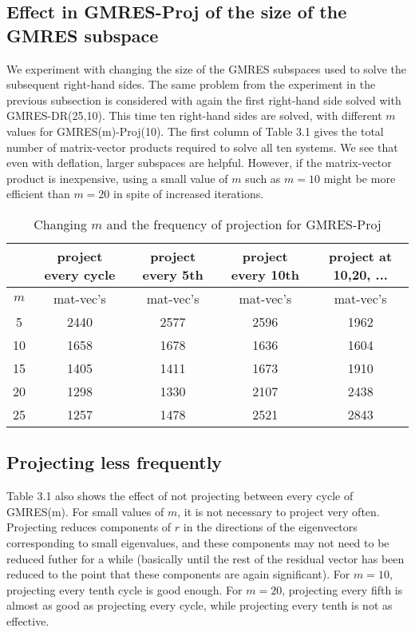 \documentclass[final]{siamltex}
\begin{document}
\subsection{Effect in GMRES-Proj of the size of the GMRES subspace} 

We experiment with changing the size of the GMRES subspaces used to solve the subsequent right-hand sides.  The same problem from the experiment in the previous subsection is considered with again the first right-hand side solved with GMRES-DR(25,10).  This time ten right-hand sides are solved, with different $m$ values for GMRES(m)-Proj(10).  The first column of Table 3.1 gives the total number of matrix-vector products required to solve all ten systems.  We see that even with deflation, larger subspaces are helpful.  However, if the matrix-vector product is inexpensive, using a small value of $m$ such as $m=10$ might be more efficient than $m=20$ in spite of increased iterations.

\begin{table}
\caption{Changing $m$ and the frequency of projection for GMRES-Proj} 

\begin{center} \footnotesize
\begin{tabular}{|c|c|c|c|c|}  \hline\hline
       & project every cycle   & project every 5th  & project every 10th & project at 10,20, ... \\ \hline
$m$    & mat-vec's  & mat-vec's & mat-vec's & mat-vec's \\  
\hline \hline
5      & 2440    & 2577 & 2596 & 1962 \\ \hline
10     & 1658    & 1678 & 1636 & 1604 \\ \hline
15     & 1405    & 1411 & 1673 & 1910 \\ \hline
20     & 1298    & 1330 & 2107 & 2438 \\ \hline 
25     & 1257    & 1478 & 2521 & 2843 \\ \hline

\hline\hline 

\end{tabular} 
\end{center} 
\end{table}  

\subsection{Projecting less frequently}

Table 3.1 also shows the effect of not projecting between every cycle of GMRES(m). For small values of $m$, it is not necessary to project very often.  Projecting reduces components of $r$ in the directions of the  eigenvectors corresponding to small eigenvalues, and these components may not need to be reduced futher for a while (basically until the rest of the residual vector has been reduced to the point that these components are again significant).  For $m=10$, projecting every tenth cycle is good enough.  For $m=20$, projecting every fifth is almost as good as projecting every cycle, while projecting every tenth is not as effective.  
\end{document}
